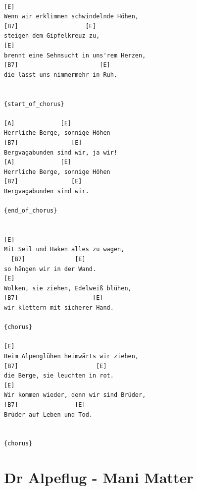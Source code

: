 \documentclass[
]{book}
\let\stdsection\section
\renewcommand\section{\clearpage\stdsection}
\begin{document}
\begin{verbatim}

[E]
Wenn wir erklimmen schwindelnde Höhen,
[B7]                   [E]
steigen dem Gipfelkreuz zu,
[E]
brennt eine Sehnsucht in uns'rem Herzen,
[B7]                       [E]
die lässt uns nimmermehr in Ruh.


{start_of_chorus}

[A]             [E]
Herrliche Berge, sonnige Höhen
[B7]               [E]
Bergvagabunden sind wir, ja wir!
[A]             [E]
Herrliche Berge, sonnige Höhen
[B7]               [E]
Bergvagabunden sind wir.

{end_of_chorus}


[E]      
Mit Seil und Haken alles zu wagen,
  [B7]              [E]
so hängen wir in der Wand.
[E]     
Wolken, sie ziehen, Edelweiß blühen,
[B7]                     [E]
wir klettern mit sicherer Hand.

{chorus}

[E]
Beim Alpenglühen heimwärts wir ziehen,
[B7]                      [E]
die Berge, sie leuchten in rot.
[E]                   
Wir kommen wieder, denn wir sind Brüder,
[B7]                [E]
Brüder auf Leben und Tod.


{chorus}
\end{verbatim}

\hypertarget{dr-alpeflug---mani-matter}{%
\section{Dr Alpeflug - Mani Matter}\label{dr-alpeflug---mani-matter}}
\end{document}
